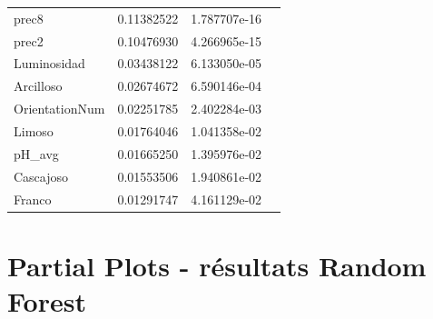 \begin{table}[H]
\begin{tabular}{llll}
		prec8          & 0.11382522 & 1.787707e-16  \\
		prec2          & 0.10476930 & 4.266965e-15  \\
		Luminosidad    & 0.03438122 & 6.133050e-05  \\
		Arcilloso      & 0.02674672 & 6.590146e-04  \\
		OrientationNum & 0.02251785 & 2.402284e-03  \\
		Limoso         & 0.01764046 & 1.041358e-02  \\
		pH\_avg        & 0.01665250 & 1.395976e-02  \\
		Cascajoso      & 0.01553506 & 1.940861e-02  \\
		Franco         & 0.01291747 & 4.161129e-02 
	\end{tabular}
\end{table}















\chapter{Partial Plots - résultats Random Forest}

%


















